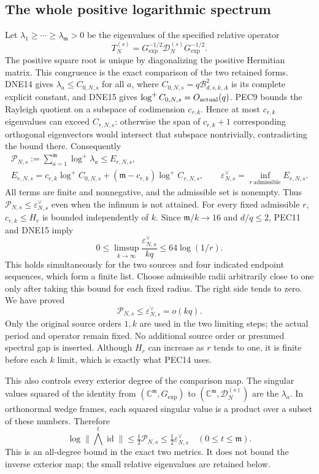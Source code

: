 \documentclass[11pt,a4paper]{article}
\begin{document}
\subsection{The whole positive logarithmic spectrum}
Let $\lambda_1\ge\cdots\ge\lambda_{\mathfrak m}>0$ be the
eigenvalues of the specified relative operator
\[
 T_N^{(s)}=G_{\exp}^{-1/2}\mathcal D_N^{(s)}G_{\exp}^{-1/2}.
 \tag{PEC12}
\]
The positive square root is unique by diagonalizing the positive
Hermitian matrix. This congruence is the exact comparison of the
two retained forms. DNE14 gives $\lambda_a\le C_{0,N,s}$ for all $a$,
where $C_{0,N,s}=q\mathcal B_{d,s,k,A}^{2}$ is its complete explicit
constant, and DNE15 gives $\log^+C_{0,N,s}=O_{\rm actual}(q)$.
PEC9 bounds the Rayleigh quotient on a subspace of codimension $c_{r,k}$.
Hence at most $c_{r,k}$ eigenvalues can exceed $C_{r,N,s}$: otherwise
the span of $c_{r,k}+1$ corresponding orthogonal eigenvectors would
intersect that subspace nontrivially, contradicting the bound there.
Consequently
\[
\begin{gathered}
 \mathcal P_{N,s}:=\sum_{a=1}^{\mathfrak m}\log^+\lambda_a
       \le E_{r,N,s},\\
 E_{r,N,s}=c_{r,k}\log^+C_{0,N,s}
        +(\mathfrak m-c_{r,k})\log^+C_{r,N,s},\qquad
 \varepsilon_{N,s}^{\vee}=\inf_{r\ \mathrm{admissible}}E_{r,N,s}.
\end{gathered}\tag{PEC13}
\]
All terms are finite and nonnegative, and the admissible set is nonempty.
Thus $\mathcal P_{N,s}\le\varepsilon_{N,s}^{\vee}$ even when the
infimum is not attained. For every fixed admissible $r$, $c_{r,k}\le H_r$
is bounded independently of $k$. Since $\mathfrak m/k\to16$ and
$d/q\le2$, PEC11 and DNE15 imply
\[
 0\le\limsup_{k\to\infty}
 \frac{\varepsilon_{N,s}^{\vee}}{kq}\le64\log(1/r).
 \tag{PEC14}
\]
This holds simultaneously for the two sources and four indicated
endpoint sequences, which form a finite list. Choose admissible radii
arbitrarily close to one only after taking this bound for each fixed
radius. The right side tends to zero. We have proved
\[
 \boxed{\quad \mathcal P_{N,s}\le\varepsilon_{N,s}^{\vee}=o(kq).
                  \quad}\tag{PEC15}
\]
Only the original source orders $1,k$ are used in the two limiting
steps; the actual period and operator remain fixed. No additional
source order or presumed spectral gap is inserted. Although $H_r$ can increase as $r$ tends to one,
it is finite before each $k$ limit, which is exactly what PEC14 uses.

This also controls every exterior degree of the comparison map.
The singular values squared of the identity from $(\mathbb C^{\mathfrak m},
G_{\exp})$ to $(\mathbb C^{\mathfrak m},\mathcal D_N^{(s)})$ are
the $\lambda_a$. In orthonormal wedge frames, each squared singular
value is a product over a subset of these numbers. Therefore
\[
 \log\|\bigwedge^t\operatorname{id}\|
     \le\tfrac12\mathcal P_{N,s}
     \le\tfrac12\varepsilon_{N,s}^{\vee}
       \quad(0\le t\le\mathfrak m).
 \tag{PEC16}
\]
This is an all-degree bound in the exact two metrics. It does not
bound the inverse exterior map; the small relative eigenvalues are
retained below.
\end{document}
